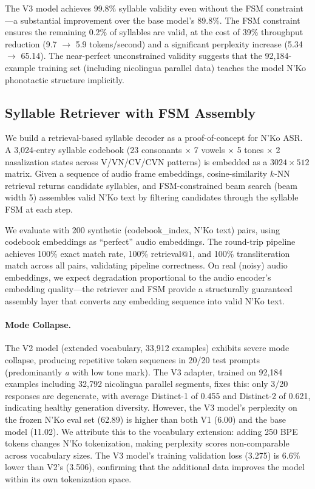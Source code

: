 \documentclass[11pt]{article}
\begin{document}
The V3 model achieves 99.8\% syllable validity even without the FSM constraint---a substantial improvement over the base model's 89.8\%.
The FSM constraint ensures the remaining 0.2\% of syllables are valid, at the cost of 39\% throughput reduction (9.7 $\to$ 5.9 tokens/second) and a significant perplexity increase (5.34 $\to$ 65.14).
The near-perfect unconstrained validity suggests that the 92,184-example training set (including nicolingua parallel data) teaches the model N'Ko phonotactic structure implicitly.

\subsection{Syllable Retriever with FSM Assembly}

We build a retrieval-based syllable decoder as a proof-of-concept for N'Ko ASR.
A 3,024-entry syllable codebook (23 consonants $\times$ 7 vowels $\times$ 5 tones $\times$ 2 nasalization states across V/VN/CV/CVN patterns) is embedded as a $3024 \times 512$ matrix.
Given a sequence of audio frame embeddings, cosine-similarity $k$-NN retrieval returns candidate syllables, and FSM-constrained beam search (beam width 5) assembles valid N'Ko text by filtering candidates through the syllable FSM at each step.

We evaluate with 200 synthetic (codebook\_index, N'Ko text) pairs, using codebook embeddings as ``perfect'' audio embeddings.
The round-trip pipeline achieves 100\% exact match rate, 100\% retrieval@1, and 100\% transliteration match across all pairs, validating pipeline correctness.
On real (noisy) audio embeddings, we expect degradation proportional to the audio encoder's embedding quality---the retriever and FSM provide a structurally guaranteed assembly layer that converts any embedding sequence into valid N'Ko text.

\paragraph{Mode Collapse.}
The V2 model (extended vocabulary, 33,912 examples) exhibits severe mode collapse, producing repetitive token sequences in 20/20 test prompts (predominantly \textit{{\selectfont a}} with low tone mark).
The V3 adapter, trained on 92,184 examples including 32,792 nicolingua parallel segments, fixes this: only 3/20 responses are degenerate, with average Distinct-1 of 0.455 and Distinct-2 of 0.621, indicating healthy generation diversity.
However, the V3 model's perplexity on the frozen N'Ko eval set (62.89) is higher than both V1 (6.00) and the base model (11.02).
We attribute this to the vocabulary extension: adding 250 BPE tokens changes N'Ko tokenization, making perplexity scores non-comparable across vocabulary sizes.
The V3 model's training validation loss (3.275) is 6.6\% lower than V2's (3.506), confirming that the additional data improves the model within its own tokenization space.
\end{document}
